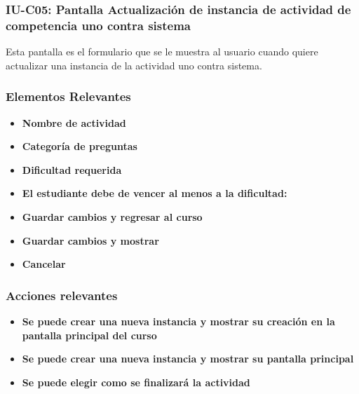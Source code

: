 
\subsubsection{IU-C05: Pantalla Actualización de instancia de actividad de competencia uno contra sistema}

Esta pantalla es el formulario que se le muestra al usuario cuando quiere actualizar una instancia de la actividad uno contra sistema.



        \subsubsection{Elementos Relevantes}

            \begin{itemize}
            \item {\bf Nombre de actividad}
            \item {\bf Categoría de preguntas}
            \item {\bf Dificultad requerida}
            \item {\bf El estudiante debe de vencer al menos a la dificultad:}
            \item {\bf Guardar cambios y regresar al curso}
            \item {\bf Guardar cambios y mostrar}
            \item {\bf Cancelar}
            \end{itemize}

        \subsubsection{Acciones relevantes}

            \begin{itemize}
            \item {\bf Se puede crear una nueva instancia y mostrar su creación en la pantalla principal del curso}
            \item {\bf Se puede crear una nueva instancia y mostrar su pantalla principal}
            \item {\bf Se puede elegir como se finalizará la actividad}
            \end{itemize}

        \clearpage
